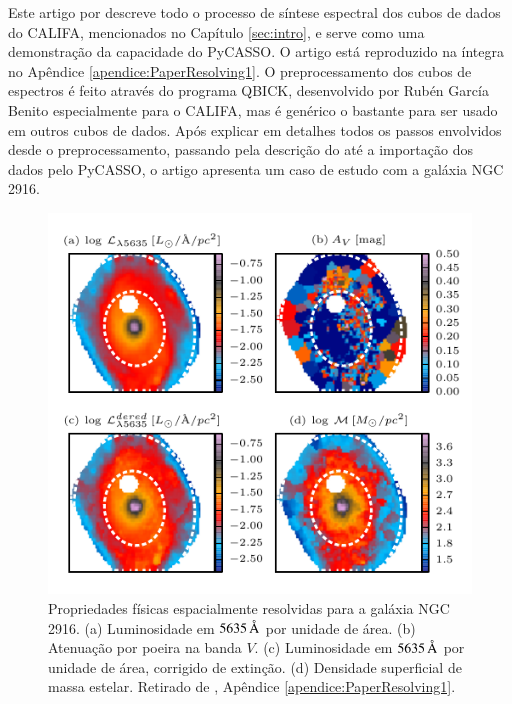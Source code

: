 Este artigo por \citet{CidFernandes2013} descreve todo o processo de síntese
espectral dos cubos de dados do CALIFA, mencionados no Capítulo \ref{sec:intro},
e serve como uma demonstração da capacidade do PyCASSO. O artigo está
reproduzido na íntegra no Apêndice \ref{apendice:PaperResolving1}. O
preprocessamento dos cubos de espectros é feito através do programa QBICK,
desenvolvido por Rubén García Benito especialmente para o CALIFA, mas é genérico
o bastante para ser usado em outros cubos de dados. Após explicar em detalhes
todos os passos envolvidos desde o preprocessamento, passando pela descrição do
\starlight até a importação dos dados pelo PyCASSO, o artigo apresenta um caso
de estudo com a galáxia NGC 2916.

\begin{figure}
	\includegraphics{figuras/L-M-AV-K0277}
	\caption[Propriedades físicas espacialmente resolvidas para a galáxia NGC
	2916] {Propriedades físicas espacialmente resolvidas para a galáxia NGC 2916. (a)
	Luminosidade em $5635\,\text{\normalfont\AA}$ por unidade de área. (b) Atenuação por
	poeira na banda $V$. (c) Luminosidade em $5635\,\text{\normalfont\AA}$ por unidade de área,
	corrigido de extinção. (d) Densidade superficial de massa estelar. Retirado de
	\citet[figura 4]{CidFernandes2013}, Apêndice \ref{apendice:PaperResolving1}.}
	\label{fig:LMAVMap}
\end{figure}


